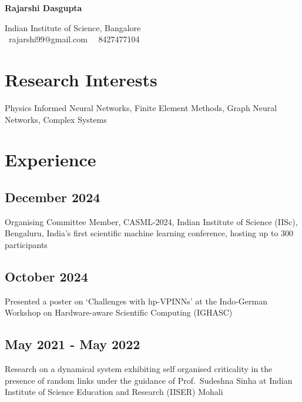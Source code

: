 \documentclass{article}
\newcommand{\theauthor}{Rajarshi Dasgupta}
\begin{document}
\begin{center}
	{\bf \huge \theauthor}

	\vspace{1em}

	Indian Institute of Science, Bangalore\\
	\Letter \, rajarshi99@gmail.com \,
	\faMobilePhone \, 8427477104
\end{center}

\section{Research Interests}

Physics Informed Neural Networks,
Finite Element Methods,
Graph Neural Networks,
Complex Systems

\section{Experience}

\subsection{December 2024}
Organising Committee Member, CASML-2024, Indian Institute of Science (IISc), Bengaluru,
India's first scientific machine learning conference, hosting up to 300 participants

\subsection{October 2024}
Presented a poster on `Challenges with hp-VPINNs'
at the Indo-German Workshop on Hardware-aware Scientific Computing (IGHASC)

\subsection{May 2021 - May 2022}
Research on a dynamical system
exhibiting self organised criticality
in the presence of random links
under the guidance of Prof.~Sudeshna Sinha
at Indian Institute of Science Education and Research (IISER)
Mohali

\end{document}
